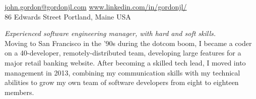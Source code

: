 \documentclass[10pt,a4paper]{article}
\begin{document}
\sloppy  %



\nobreakvspace{0.3em}  %

\noindent\href{mailto:john.gordon@gordonjl.com}{john.gordon\mbox{}@\mbox{}gordonjl.com}\sbull
{}\sbull
\href{https://www.linkedin.com/in/gordonjl/}{www.linkedin.com/in/gordonjl/}
\\
86 Edwards Street\sbull
Portland, Maine\sbull
USA

\spacedhrule{0.9em}{-0.4em}  %


\vspace{-1.3em}  %
\begin{multicols}{2}  %
\noindent \emph{Experienced software engineering manager, with hard 
and soft skills.}
\\
Moving to San Francisco in the '90s during the dotcom boom, I became a coder on a 40-developer, remotely-distributed team, developing large features for a major retail banking website. After becoming a skilled tech lead, I moved into management in 2013, combining my communication skills with my technical abilities to grow my own team of software developers from eight to eighteen members.
\end{multicols}


\spacedhrule{0em}{-0.4em}

\end{document}
